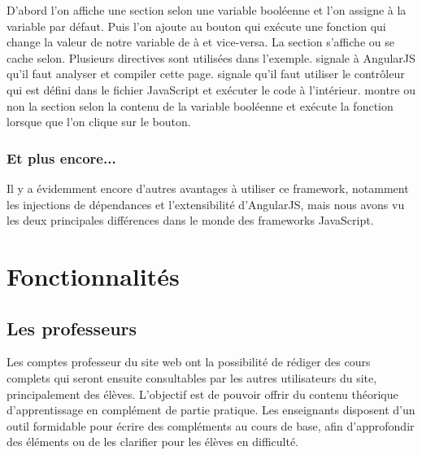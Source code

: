 \documentclass[letterpaper,10pt,oneside]{sphinxmanual}
\begin{document}
D'abord l'on affiche une section selon une variable booléenne  et l'on assigne à la variable  par défaut. Puis l'on ajoute au bouton qui exécute une fonction qui change la valeur de notre variable  de  à  et vice-versa. La section s'affiche ou se cache selon. Plusieurs directives sont utilisées dans l'exemple.  signale à AngularJS qu'il faut analyser et compiler cette page.  signale qu'il faut utiliser le contrôleur  qui est défini dans le fichier JavaScript et exécuter le code à l'intérieur.  montre ou non la section selon la contenu de la variable booléenne  et  exécute la fonction  lorsque que l'on clique sur le bouton.


\subsection{Et plus encore...}
\label{angularjs:et-plus-encore}
Il y a évidemment encore d'autres avantages à utiliser ce framework, notamment les injections de dépendances et l'extensibilité d'AngularJS, mais nous avons vu les deux principales différences dans le monde des frameworks JavaScript.


\chapter{Fonctionnalités}
\label{functionalities::doc}\label{functionalities:fonctionnalites}

\section{Les professeurs}
\label{functionalities:les-professeurs}
Les comptes professeur du site web ont la possibilité de rédiger des cours complets qui seront ensuite consultables par les autres utilisateurs du site, principalement des élèves. L'objectif est de pouvoir offrir du contenu théorique d'apprentissage en complément de partie pratique. Les enseignants disposent d'un outil formidable pour écrire des compléments au cours de base, afin d'approfondir des éléments ou de les clarifier pour les élèves en difficulté.
\end{document}
